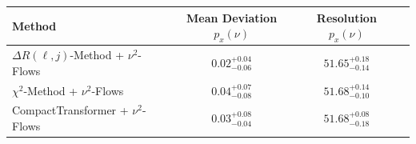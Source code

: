     \begin{tabular}{lccc}
        \toprule
        Method & Mean Deviation $p_{x}(\nu)$ & Resolution $p_{x}(\nu)$ \\
        \midrule
        $\Delta R(\ell,j)$-Method + $\nu^2$-Flows & $0.02^{+0.04}_{-0.06}$ & $51.65^{+0.18}_{-0.14}$ \\
        $\chi^2$-Method + $\nu^2$-Flows & $0.04^{+0.07}_{-0.08}$ & $51.68^{+0.14}_{-0.10}$ \\
        CompactTransformer + $\nu^2$-Flows & $0.03^{+0.08}_{-0.04}$ & $51.68^{+0.08}_{-0.18}$ \\
        \bottomrule
    \end{tabular}